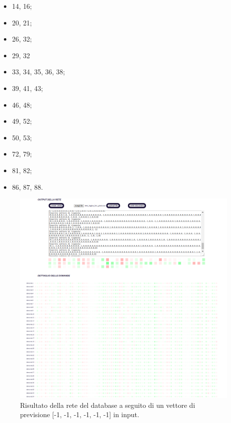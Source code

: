 \begin{itemize}
\begin{enumerate}
\begin{itemize}
\item 14, 16;
\item 20, 21;
\item 26, 32;
\item 29, 32
\item 33, 34, 35, 36, 38;
\item 39, 41, 43;
\item 46, 48;
\item 49, 52;
\item 50, 53;
\item 72, 79;
\item 81, 82;
\item 86, 87, 88.
\end{itemize}
\end{enumerate}

\begin{figure}[H]
\centering
	\includegraphics[width=0.90\linewidth]{./image/rete_db-vpmeno1.png}
	\caption{Risultato della rete del database a seguito di un vettore di previsione [-1, -1, -1, -1, -1, -1] in input.}
		\label{Risultato della rete del database a seguito di un vettore di previsione [-1, -1, -1, -1, -1, -1] in input.}
\end{figure}


\end{itemize}
